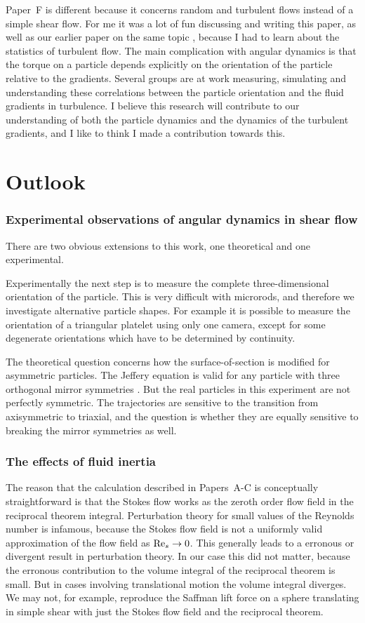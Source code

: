 \documentclass[thesis.tex]{subfiles}
\begin{document}
Paper~F is different because it concerns random and turbulent flows instead of a simple shear flow. For me it was a lot of fun discussing and writing this paper, as well as our earlier paper on the same topic \cite{gustavsson2014}, because I had to learn about the statistics of turbulent flow. The main complication with angular dynamics is that the torque on a particle depends explicitly on the orientation of the particle relative to the gradients. Several groups are at work measuring, simulating and understanding these correlations between the particle orientation and the fluid gradients in turbulence. I believe this research will contribute to our understanding of both the particle dynamics and the dynamics of the turbulent gradients, and I like to think I made a contribution towards this.

\section{Outlook}

\subsubsection{Experimental observations of angular dynamics in shear flow}
There are two obvious extensions to this work, one theoretical and one experimental.

Experimentally the next step is to measure the complete three-dimensional orientation of the particle. This is very difficult with microrods, and therefore we investigate alternative particle shapes. For example it is possible to measure the orientation of a triangular platelet using only one camera, except for some degenerate orientations which have to be determined by continuity.

The theoretical question concerns how the surface-of-section is modified for asymmetric particles. The Jeffery equation is valid for any particle with three orthogonal mirror symmetries \cite{brenner1964}. But the real particles in this experiment are not perfectly symmetric. The trajectories are sensitive to the transition from axisymmetric to triaxial, and the question is whether they are equally sensitive to breaking the mirror symmetries as well. 

\subsubsection{The effects of fluid inertia}
The reason that the calculation described in Papers~A-C is conceptually straightforward is that the Stokes flow works as the zeroth order flow field in the reciprocal theorem integral. Perturbation theory for small values of the Reynolds number is infamous, because the Stokes flow field is not a uniformly valid approximation of the flow field as $\textrm{Re}_s\to0$. This generally leads to a erronous or divergent result in perturbation theory. In our case this did not matter, because the erronous contribution to the volume integral of the reciprocal theorem is small. But in cases involving translational motion the volume integral diverges. We may not, for example, reproduce the Saffman lift force on a sphere translating in simple shear with just the Stokes flow field and the reciprocal theorem.
\end{document}
